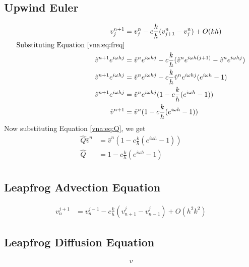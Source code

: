 \subsection{Upwind Euler}
\begin{equation*}
\begin{align}
    v_j^{n+1}	&= v_j^n - c\frac{k}{h}(v_{j+1}^n - v_j^n) + O(kh)					\\
    \text{Substituting Equation \ref{vna:eq:freq}} 							\\
    \hat{v}^{n+1}e^{i\omega hj} &= \hat{v}^ne^{i\omega hj} - c\frac{k}{h} (\hat{v}^ne^{i\omega h(j+1)} - \hat{v}^ne^{i\omega hj})									    \\
    \hat{v}^{n+1}e^{i\omega hj} &= \hat{v}^ne^{i\omega hj} - c\frac{k}{h} \hat{v}^ne^{i\omega hj} (e^{i\omega h} - 1)												    \\
    \hat{v}^{n+1}e^{i\omega hj} &= \hat{v}^ne^{i\omega hj}(1 - c\frac{k}{h} (e^{i\omega h} - 1))	\\
    \hat{v}^{n+1} &= \hat{v}^n(1 - c\frac{k}{h} (e^{i\omega h} - 1))					\\
\end{align}
\end{equation*}
Now substituting Equation \ref{vna:eq:Q}, we get
\begin{equation*}
\begin{align}
    \hat{Q}\hat{v}^n &= \hat{v}^n(1 - c\frac{k}{h} (e^{i\omega h} - 1))	\\
    \hat{Q} &= 1 - c\frac{k}{h} (e^{i\omega h} - 1)			\\
\end{align}
\end{equation*}

\subsection{Leapfrog Advection Equation}
\begin{equation}
\begin{align}
    v_n^{j+1}	&= v_n^{j-1} - c\frac{k}{h}(v_{n+1}^j - v_{n-1}^j) + O(h^2k^2)
\end{align}
\end{equation}
\subsection{Leapfrog Diffusion Equation}
\begin{equation}
\begin{align}
    v
\end{align}
\end{equation}
